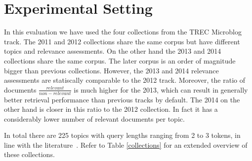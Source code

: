 \section{Experimental Setting}
\label{experiment}

 In this evaluation we have used the four collections from the TREC Microblog track. The 2011 and 2012 collections share the same corpus but have different topics and relevance assessments. On the other hand the 2013 and 2014 collections share the same corpus. The later corpus is an order of magnitude bigger than previous collections. However, the 2013 and 2014 relevance assessments are statiscally comparable to the 2012 track. Moreover, the ratio of documents \(\frac{relevant}{non-relevant}\) is much higher for the 2013, which can result in generally better retrieval performance than previous tracks by default. The 2014 on the other hand is closer in this ratio to the 2012 collection. In fact it has a considerably lower number of relevant documents per topic.

In total there are 225 topics with query lengths ranging from 2 to 3 tokens, in line with the literature~\cite{teevan2011twittersearch}. Refer to Table \ref{collections} for an extended overview of these collections. \\







